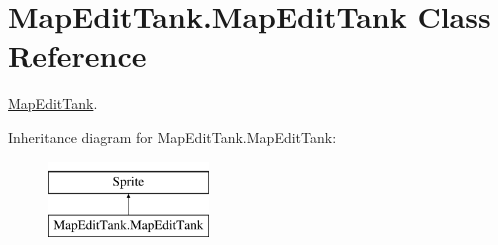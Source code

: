 \hypertarget{class_map_edit_tank_1_1_map_edit_tank}{}\section{Map\+Edit\+Tank.\+Map\+Edit\+Tank Class Reference}
\label{class_map_edit_tank_1_1_map_edit_tank}


\mbox{\hyperlink{class_map_edit_tank_1_1_map_edit_tank}{Map\+Edit\+Tank}}.  


Inheritance diagram for Map\+Edit\+Tank.\+Map\+Edit\+Tank\+:\begin{figure}[H]
\begin{center}
\leavevmode
\includegraphics[height=2.000000cm]{class_map_edit_tank_1_1_map_edit_tank}
\end{center}
\end{figure}
